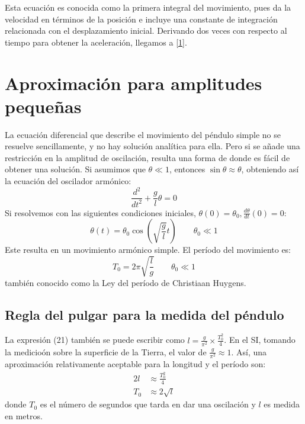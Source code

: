 \documentclass[12pt]{article}
\begin{document}
Esta ecuación es conocida como la primera integral del movimiento, pues da la velocidad en términos de la posición e incluye una constante de integración relacionada con el desplazamiento inicial. Derivando dos veces con respecto al tiempo para obtener la aceleración, llegamos a \eqref{1}.

\section{Aproximación para amplitudes pequeñas}
La ecuación diferencial que describe el movimiento del péndulo simple no se resuelve sencillamente, y no hay solución analítica para ella. Pero si se añade una restricción en la amplitud de oscilación, resulta una forma de donde es fácil de obtener una solución. Si asumimos que $\theta \ll 1$, entonces $\sin\theta\approx\theta$, obteniendo así la ecuación del oscilador armónico:
\begin{equation}
\frac{d^2}{dt^2}+\frac{g}{l}\theta=0
\end{equation}
Si resolvemos con las siguientes condiciones iniciales, $\theta(0)=\theta_0, \frac{d\theta}{dt}(0)=0$:
\begin{equation}
\theta(t)=\theta_0\cos\left(\sqrt{\frac{g}{l}}t\right) \qquad \theta_0\ll1
\end{equation}
Este resulta en un movimiento armónico simple. El período del movimiento es:
\begin{equation}
T_0=2\pi\sqrt{\frac{l}{g}}\qquad \theta_0\ll1
\end{equation}
también conocido como la Ley del período de Christiaan Huygens.

\subsection{Regla del pulgar para la medida del péndulo}
La expresión (21) también se puede escribir como $l=\frac{g}{\pi ^2}\times\frac{T_0 ^2}{4}$. En el SI, tomando la medicioón sobre la superficie de la Tierra, el valor de $\frac{g}{\pi ^2}\approx1$. Así, una aproximación relativamente aceptable para la longitud y el período son:
\begin{alignat}{2}
l&\approx \frac{T_0 ^2}{4} \\
T_0&\approx 2\sqrt{l}
\end{alignat}
donde $T_0$ es el número de segundos que tarda en dar una oscilación y $l$ es medida en metros.
\end{document}
